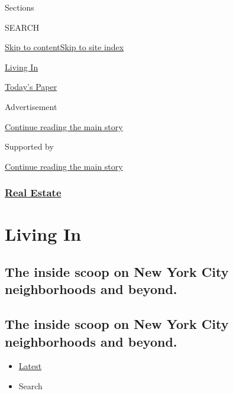 Sections

SEARCH

\protect\hyperlink{site-content}{Skip to
content}\protect\hyperlink{site-index}{Skip to site index}

\href{https://www.nytimes3xbfgragh.onion/column/living-in}{Living In}

\href{https://myaccount.nytimes3xbfgragh.onion/auth/login?response_type=cookie\&client_id=vi}{}

\href{https://www.nytimes3xbfgragh.onion/section/todayspaper}{Today's
Paper}

Advertisement

\protect\hyperlink{after-top}{Continue reading the main story}

Supported by

\protect\hyperlink{after-sponsor}{Continue reading the main story}

\hypertarget{real-estate}{%
\subsubsection{\texorpdfstring{\href{/section/realestate}{Real
Estate}}{Real Estate}}\label{real-estate}}

\hypertarget{living-in}{%
\section{Living In}\label{living-in}}

\hypertarget{the-inside-scoop-on-new-york-city-neighborhoods-and-beyond}{%
\subsection{The inside scoop on New York City neighborhoods and
beyond.}\label{the-inside-scoop-on-new-york-city-neighborhoods-and-beyond}}

\hypertarget{the-inside-scoop-on-new-york-city-neighborhoods-and-beyond-1}{%
\subsection{The inside scoop on New York City neighborhoods and
beyond.}\label{the-inside-scoop-on-new-york-city-neighborhoods-and-beyond-1}}

\begin{itemize}
\tightlist
\item
  \protect\hyperlink{stream-panel}{Latest}
\item
  Search
\end{itemize}

